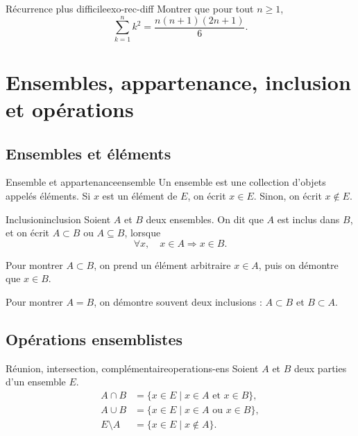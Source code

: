 \documentclass[11pt,a4paper]{article}
\begin{document}
\begin{exercicebox}{Récurrence plus difficile}{exo-rec-diff}
Montrer que pour tout $n\geq1$,
\[
\sum_{k=1}^n k^2=\frac{n(n+1)(2n+1)}6.
\]
\end{exercicebox}

\section{Ensembles, appartenance, inclusion et opérations}

\subsection{Ensembles et éléments}

\begin{definitionbox}{Ensemble et appartenance}{ensemble}
Un ensemble est une collection d'objets appelés éléments. Si $x$ est un élément de $E$, on écrit $x\in E$. Sinon, on écrit $x\notin E$.
\end{definitionbox}

\begin{definitionbox}{Inclusion}{inclusion}
Soient $A$ et $B$ deux ensembles. On dit que $A$ est inclus dans $B$, et on écrit $A\subset B$ ou $A\subseteq B$, lorsque
\[
\forall x,\quad x\in A\Rightarrow x\in B.
\]
\end{definitionbox}

\begin{methodebox}
Pour montrer $A\subset B$, on prend un élément arbitraire $x\in A$, puis on démontre que $x\in B$.

Pour montrer $A=B$, on démontre souvent deux inclusions : $A\subset B$ et $B\subset A$.
\end{methodebox}

\subsection{Opérations ensemblistes}

\begin{definitionbox}{Réunion, intersection, complémentaire}{operations-ens}
Soient $A$ et $B$ deux parties d'un ensemble $E$.
\begin{align*}
A\cap B&=\{x\in E\mid x\in A\text{ et }x\in B\},\\
A\cup B&=\{x\in E\mid x\in A\text{ ou }x\in B\},\\
E\setminus A&=\{x\in E\mid x\notin A\}.
\end{align*}
\end{definitionbox}
\end{document}
